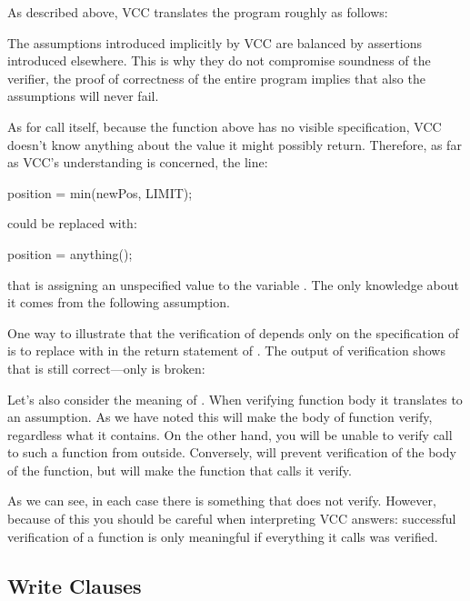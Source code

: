 As described above, VCC translates the program roughly as follows:

\begin{note}
The assumptions introduced implicitly by VCC are balanced by assertions
introduced elsewhere.
This is why they do not compromise soundness of the verifier,
\ie the proof of correctness of the entire program implies
that also the assumptions will never fail.
\end{note}

As for call itself, because the  function above has no
visible specification, VCC doesn't know anything about the value it
might possibly return.  Therefore, as far as VCC's understanding is
concerned, the line:
\begin{VCC}
position = min(newPos, LIMIT);
\end{VCC}
\noindent
could be replaced with:
\begin{VCC}
position = anything();
\end{VCC}
\noindent
that is assigning an unspecified value to the variable .
The only knowledge about it comes from the following assumption.

One way to illustrate that the verification of  
depends only on the specification of  is to 
replace \vcc{<} with \vcc{>} in the return statement of .
The output of verification shows that  is still correct---only 
 is broken:

Let's also consider the meaning of .
When verifying function body it translates to an assumption.
As we have noted this will make the body of function verify,
regardless what it contains.
On the other hand, you will be unable to verify call to such a function
from outside.
Conversely,  will prevent verification
of the body of the function, but will make the function that calls
it verify.

As we can see, in each case there is something that does not verify.
However, because of this you should be careful when interpreting
VCC answers: successful verification of a function is only meaningful
if everything it calls was verified.

\subsection{Write Clauses}
\label{sect:writes}


